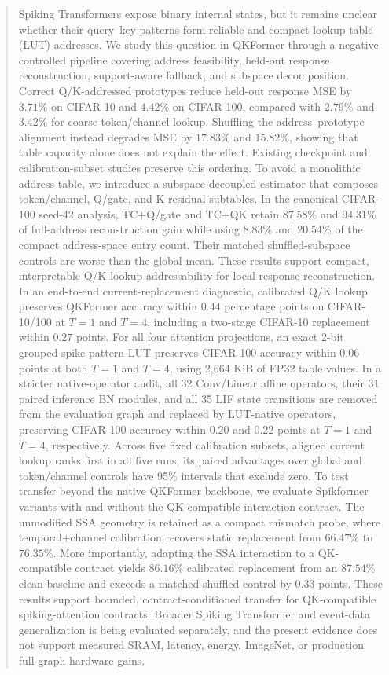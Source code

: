 \begin{abstract}
Spiking Transformers expose binary internal states, but it remains unclear
whether their query--key patterns form reliable and compact lookup-table (LUT)
addresses. We study this question in QKFormer through a negative-controlled
pipeline covering address feasibility, held-out response reconstruction,
support-aware fallback, and subspace decomposition. Correct Q/K-addressed
prototypes reduce held-out response MSE by $3.71\%$ on CIFAR-10 and $4.42\%$
on CIFAR-100, compared with $2.79\%$ and $3.42\%$ for coarse token/channel
lookup. Shuffling the address--prototype alignment instead degrades MSE by
$17.83\%$ and $15.82\%$, showing that table capacity alone does not explain the
effect. Existing checkpoint and calibration-subset studies preserve this
ordering. To avoid a monolithic address table, we introduce a
subspace-decoupled estimator that composes token/channel, Q/gate, and K
residual subtables. In the canonical CIFAR-100 seed-42 analysis, TC+Q/gate and
TC+QK retain $87.58\%$ and $94.31\%$ of full-address reconstruction gain while
using $8.83\%$ and $20.54\%$ of the compact address-space entry count. Their
matched shuffled-subspace controls are worse than the global mean. These
results support compact, interpretable Q/K lookup-addressability for local
response reconstruction. In an end-to-end current-replacement diagnostic,
calibrated Q/K lookup preserves QKFormer accuracy within $0.44$ percentage
points on CIFAR-10/100 at $T=1$ and $T=4$, including a two-stage CIFAR-10
replacement within $0.27$ points. For all four attention projections, an exact
2-bit grouped spike-pattern LUT preserves CIFAR-100 accuracy within $0.06$
points at both $T=1$ and $T=4$, using 2,664 KiB of FP32 table values.
In a stricter native-operator audit, all 32 Conv/Linear affine operators,
their 31 paired inference BN modules, and all 35 LIF state transitions are
removed from the evaluation graph and replaced by LUT-native operators,
preserving CIFAR-100 accuracy within $0.20$ and $0.22$ points at $T=1$ and
$T=4$, respectively.
Across five fixed calibration subsets, aligned current lookup ranks first in
all five runs; its paired advantages over global and token/channel controls
have 95\% intervals that exclude zero. To test transfer beyond the native
QKFormer backbone, we evaluate Spikformer variants with and without the
QK-compatible interaction contract. The unmodified SSA geometry is retained as
a compact mismatch probe, where temporal+channel calibration recovers static
replacement from $66.47\%$ to $76.35\%$. More importantly, adapting the SSA
interaction to a QK-compatible contract yields $86.16\%$ calibrated replacement
from an $87.54\%$ clean baseline and exceeds a matched shuffled control by
$0.33$ points. These results support bounded, contract-conditioned transfer for
QK-compatible spiking-attention contracts. Broader Spiking Transformer and
event-data generalization is being evaluated separately, and the present
evidence does not support measured SRAM, latency, energy, ImageNet, or
production full-graph hardware gains.
\end{abstract}
